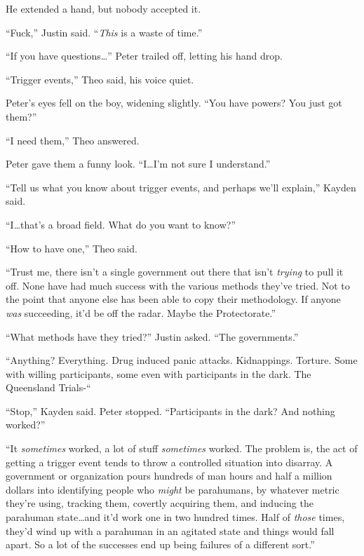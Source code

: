 He extended a hand, but nobody accepted it.



``Fuck,'' Justin said.  ``\emph{This} is a waste of time.''



``If you have questions\ldots'' Peter trailed off, letting his hand drop.



``Trigger events,'' Theo said, his voice quiet.



Peter's eyes fell on the boy, widening slightly.  ``You have powers?  You just got them?''



``I need them,'' Theo answered.



Peter gave them a funny look.  ``I\ldots I'm not sure I understand.''



``Tell us what you know about trigger events, and perhaps we'll explain,'' Kayden said.



``I\ldots that's a broad field.  What do you want to know?''



``How to have one,'' Theo said.



``Trust me, there isn't a single government out there that isn't \emph{trying} to pull it off.  None have had much success with the various methods they've tried.  Not to the point that anyone else has been able to copy their methodology.  If anyone \emph{was} succeeding, it'd be off the radar.  Maybe the Protectorate.''



``What methods have they tried?'' Justin asked.  ``The governments.''



``Anything?  Everything.  Drug induced panic attacks.  Kidnappings.  Torture.  Some with willing participants, some even with participants in the dark.  The Queensland Trials-``



``Stop,'' Kayden said.  Peter stopped.  ``Participants in the dark?  And nothing worked?''



``It \emph{sometimes} worked, a lot of stuff \emph{sometimes} worked.  The problem is, the act of getting a trigger event tends to throw a controlled situation into disarray.  A government or organization pours hundreds of man hours and half a million dollars into identifying people who \emph{might} be parahumans, by whatever metric they're using, tracking them, covertly acquiring them, and inducing the parahuman state\ldots and it'd work one in two hundred times.  Half of \emph{those} times, they'd wind up with a parahuman in an agitated state and things would fall apart.  So a lot of the successes end up being failures of a different sort.''



